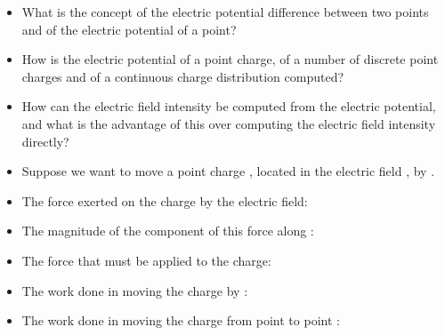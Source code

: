 \ELhold


\begin{ELunit}


\begin{itemize}
\item
  What is the concept of the electric potential difference between two points and of the electric potential of a point?
\item
  How is the electric potential of a point charge, of a number of discrete point charges and of a continuous charge distribution computed?
\item
  How can the electric field intensity be computed from the electric potential, and what is the advantage of this over computing the electric field intensity directly?
\item
  Suppose we want to move a point charge , located in the electric field , by .
\end{itemize}


\begin{itemize}
\item
  The force exerted on the charge by the electric field:
\item
  The magnitude of the component of this force along :
\item
  The force that must be applied to the charge:
\item
  The work done in moving the charge by :
\item
  The work done in moving the charge from point  to point :
\end{itemize}


\end{ELunit}


